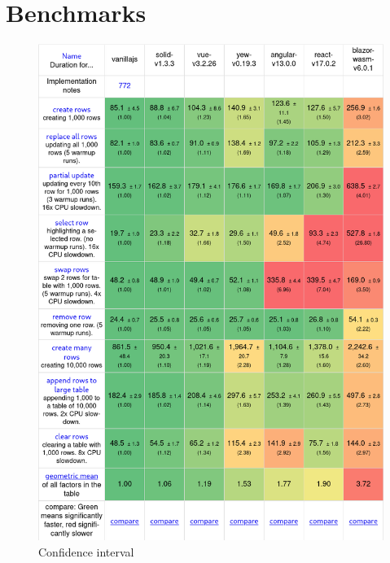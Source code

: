 \chapter{Benchmarks}
\label{appendix:bench}

\begin{figure}
  \begin{center}
    \includegraphics[width=\textwidth]{figures/benchmarks/confidence_interval.png}
  \end{center}
  \caption{Confidence interval}
  \label{fig:bench_confidence}
\end{figure}

